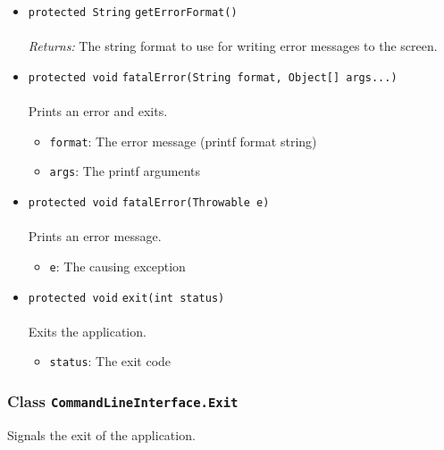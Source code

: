 \begin{itemize}
\item \lstinline|protected String| \lstinline|getErrorFormat|\lstinline|()|\\ \\[-0.6em]
\emph{Returns:} The string format to use for writing error messages to the
 screen.



\item \lstinline|protected void| \lstinline|fatalError|\lstinline|(String format, Object[] args...)|\\ \\[-0.6em]
Prints an error and exits.
\begin{itemize}
\item \lstinline|format|: The error message (printf format string)
\item \lstinline|args|: The printf arguments
\end{itemize}



\item \lstinline|protected void| \lstinline|fatalError|\lstinline|(Throwable e)|\\ \\[-0.6em]
Prints an error message.
\begin{itemize}
\item \lstinline|e|: The causing exception
\end{itemize}



\item \lstinline|protected void| \lstinline|exit|\lstinline|(int status)|\\ \\[-0.6em]
Exits the application.
\begin{itemize}
\item \lstinline|status|: The exit code
\end{itemize}



\end{itemize}

\subsubsection{Class \lstinline|CommandLineInterface.Exit|}
Signals the exit of the application. \\
\noindent\begin{minipage}[t]{5cm}
\vspace{0.3em}
\hspace*{2em}
\vspace{0.3em}
\end{minipage}



